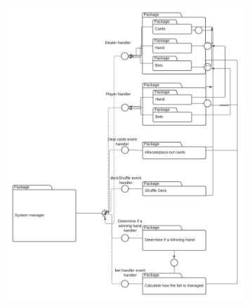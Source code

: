 \documentclass[12pt, a4paper]{article}
\begin{document}
\begin{figure}[ht!]
\centering
\includegraphics[width=90mm]{"blackjack UML.jpeg"}
\end{figure}
\end{document}
